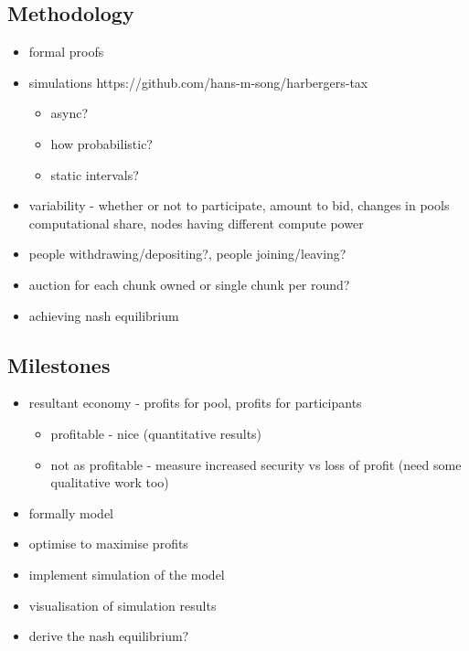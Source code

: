 \subsection{Methodology}

\begin{itemize}
  \item formal proofs
  \item simulations https://github.com/hans-m-song/harbergers-tax 
  \begin{itemize}
    \item async? 
    \item how probabilistic?
    \item static intervals?
  \end{itemize}
  \item variability - whether or not to participate, amount to bid, changes in pools computational share, nodes having different compute power
  \item people withdrawing/depositing?, people joining/leaving?
  \item auction for each chunk owned or single chunk per round?
  \item achieving nash equilibrium
\end{itemize}

\subsection{Milestones}

\begin{itemize}
  \item resultant economy - profits for pool, profits for participants
  \begin{itemize}
    \item profitable - nice (quantitative results)
    \item not as profitable - measure increased security vs loss of profit (need some qualitative work too)
  \end{itemize}
\end{itemize}

\begin{itemize}
 
  \item formally model
  \item optimise to maximise profits
  \item implement simulation of the model
  \item visualisation of simulation results
  \item derive the nash equilibrium?
\end{itemize} 

